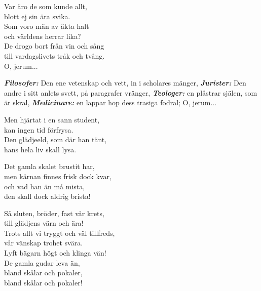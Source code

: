 Var äro de som kunde allt,\\
blott ej sin ära svika.\\
Som voro män av äkta halt\\
och världens herrar lika?\\
De drogo bort från vin och sång\\
till vardagslivets tråk och tvång.\\
O, jerum...

\textbf{\textit{Filosofer:}} Den ene vetenskap och vett,
in i scholares mänger,
\textbf{\textit{Jurister:}} Den andre i sitt anlets svett,
på paragrafer vränger,
\textbf{\textit{Teologer:}} en plåstrar själen, som är skral,
\textbf{\textit{Medicinare:}} en lappar hop dess trasiga fodral;
O, jerum...

Men hjärtat i en sann student,\\
kan ingen tid förfrysa.\\
Den glädjeeld, som där han tänt,\\
hans hela liv skall lysa.

Det gamla skalet brustit har,\\
men kärnan finnes frisk dock kvar,\\
och vad han än må mista,\\
den skall dock aldrig brista!

Så sluten, bröder, fast vår krets,\\
till glädjens värn och ära!\\
Trots allt vi tryggt och väl tillfreds,\\
vår vänskap trohet svära.\\
Lyft bägarn högt och klinga vän!\\
De gamla gudar leva än,\\
bland skålar och pokaler,\\
bland skålar och pokaler!

